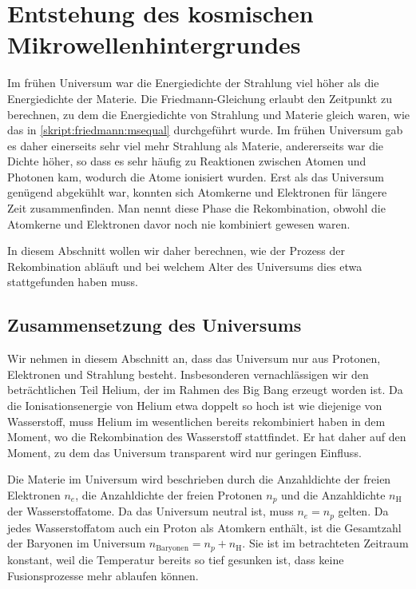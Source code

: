 \section{Entstehung des kosmischen Mikrowellenhintergrundes%
\label{skript:cmb:section:rekombination}}
Im frühen Universum war die Energiedichte der Strahlung viel höher
als die Energiedichte der Materie.
Die Friedmann-Gleichung erlaubt den Zeitpunkt zu berechnen,
zu dem die Energiedichte von Strahlung und Materie gleich waren,
wie das in \eqref{skript:friedmann:msequal} durchgeführt wurde.
Im frühen Universum gab es daher einerseits sehr viel mehr Strahlung
als Materie, andererseits war die Dichte höher, so dass es sehr
häufig zu Reaktionen zwischen Atomen und Photonen kam, wodurch die
Atome ionisiert wurden.
Erst als das Universum genügend abgekühlt war, konnten sich Atomkerne
und Elektronen für längere Zeit zusammenfinden.
Man nennt diese Phase die Rekombination, obwohl die Atomkerne und
Elektronen davor noch nie kombiniert gewesen waren.


In diesem Abschnitt wollen wir daher berechnen, wie der Prozess der
Rekombination abläuft und bei welchem Alter des Universums dies
etwa stattgefunden haben muss.

\subsection{Zusammensetzung des Universums%
\label{section:cmb:dichte}}
Wir nehmen in diesem Abschnitt an, dass das Universum nur aus 
Protonen, Elektronen und Strahlung besteht.
Insbesonderen vernachlässigen wir den beträchtlichen Teil
Helium, der im Rahmen des Big Bang erzeugt worden ist.
Da die Ionisationsenergie von Helium etwa doppelt so hoch ist wie
diejenige von Wasserstoff, muss Helium im wesentlichen bereits
rekombiniert haben in dem Moment, wo die Rekombination des Wasserstoff
stattfindet.
Er hat daher auf den Moment, zu dem das Universum transparent wird
nur geringen Einfluss.

Die Materie im Universum wird beschrieben durch die Anzahldichte
der freien Elektronen $n_e$, die Anzahldichte der freien Protonen $n_p$
und die Anzahldichte $n_\text{H}$ der Wasserstoffatome.
Da das Universum neutral ist, muss $n_e=n_p$ gelten.
Da jedes Wasserstoffatom auch ein Proton als Atomkern enthält, ist die
Gesamtzahl der Baryonen im Universum $n_\text{Baryonen} = n_p+n_\text{H}$.
Sie ist im betrachteten Zeitraum konstant, weil die Temperatur bereits
so tief gesunken ist, dass keine Fusionsprozesse mehr ablaufen können.

